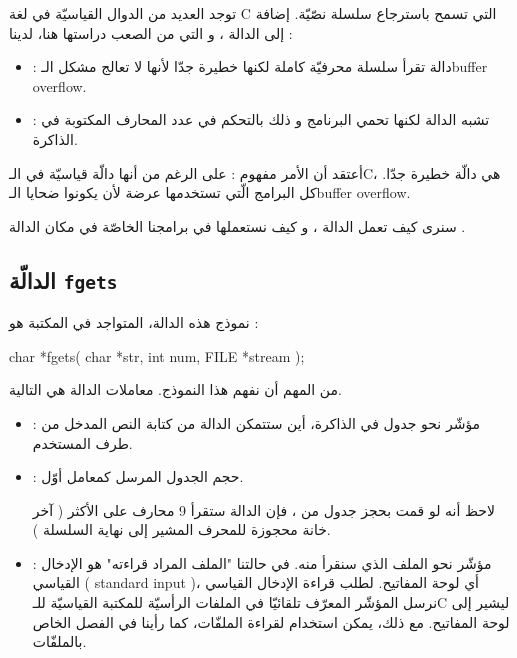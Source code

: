 توجد العديد من الدوال القياسيّة في لغة
\textenglish{C}
التي تسمح باسترجاع سلسلة نصّيّة. إضافة إلى الدالة
،
و التي من الصعب دراستها هنا، لدينا :

\begin{itemize}
  \item {}:
دالة تقرأ سلسلة محرفيّة كاملة لكنها خطيرة جدّا لأنها لا تعالج مشكل الـ\textenglish{buffer overflow}.
  \item {} :
 تشبه الدالة
لكنها تحمي البرنامج و ذلك بالتحكم في عدد المحارف المكتوبة في الذاكرة.
\end{itemize}

أعتقد أن الأمر مفهوم : على الرغم من أنها دالّة قياسيّة في الـ\textenglish{C}،
هي دالّة خطيرة  جدّا. كل البرامج الّتي تستخدمها عرضة لأن يكونوا ضحايا الـ\textenglish{buffer overflow}.

سنرى كيف تعمل الدالة
،
و كيف نستعملها في برامجنا الخاصّة في مكان الدالة
.

\subsection{الدالّة \texttt{fgets}}

نموذج هذه الدالة، المتواجد في المكتبة
هو :

\begin{Csource}
char *fgets( char *str, int num, FILE *stream );
\end{Csource}

من المهم أن نفهم هذا النموذج. معاملات الدالة هي التالية.

\begin{itemize}
  \item {} :
مؤشّر نحو جدول في الذاكرة، أين ستتمكن الدالة من كتابة النص المدخل من طرف المستخدم.
  \item {} :
حجم الجدول
المرسل كمعامل أوّل.

لاحظ أنه لو قمت بحجز جدول من
،
فإن الدالة
ستقرأ 9 محارف على الأكثر ( آخر خانة محجوزة للمحرف
المشير إلى نهاية السلسلة ).
  \item {} :
مؤشّر نحو الملف الذي سنقرأ منه. في حالتنا "الملف المراد قراءته" هو الإدخال القياسي
( \textenglish{standard input} )،
أي لوحة المفاتيح. لطلب قراءة الإدخال القياسي نرسل المؤشّر
المعرّف تلقائيّا في الملفات الرأسيّة للمكتبة القياسيّة للـ\textenglish{C}
ليشير إلى لوحة المفاتيح. مع ذلك، يمكن استخدام
لقراءة الملفّات، كما رأينا في الفصل الخاص بالملفّات.
\end{itemize}

